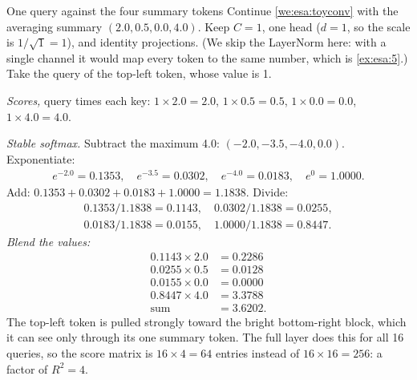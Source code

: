 \begin{worked}[label={we:esa:toyattn}]{One query against the four summary tokens}
Continue \cref{we:esa:toyconv} with the averaging summary $(2.0, 0.5, 0.0, 4.0)$. Keep $C = 1$,
one head ($d = 1$, so the scale is $1/\sqrt1 = 1$), and identity projections. (We skip the
LayerNorm here: with a single channel it would map every token to the same number, which is
\cref{ex:esa:5}.) Take the query of the top-left token, whose value is 1.

\emph{Scores,} query times each key: $1\times2.0 = 2.0$, $1\times0.5 = 0.5$, $1\times0.0 = 0.0$,
$1\times4.0 = 4.0$.

\emph{Stable softmax.} Subtract the maximum 4.0: $(-2.0, -3.5, -4.0, 0.0)$. Exponentiate:
\begin{align*}
  e^{-2.0} = 0.1353,\quad e^{-3.5} = 0.0302,\quad e^{-4.0} = 0.0183,\quad e^{0} = 1.0000 .
\end{align*}
Add: $0.1353 + 0.0302 + 0.0183 + 1.0000 = 1.1838$. Divide:
\begin{align*}
  0.1353/1.1838 = 0.1143,\quad 0.0302/1.1838 = 0.0255,\\
  0.0183/1.1838 = 0.0155,\quad 1.0000/1.1838 = 0.8447 .
\end{align*}
\emph{Blend the values:}
\begin{align*}
  0.1143\times2.0 &= 0.2286\\
  0.0255\times0.5 &= 0.0128\\
  0.0155\times0.0 &= 0.0000\\
  0.8447\times4.0 &= 3.3788\\
  \text{sum} &= 3.6202 .
\end{align*}
The top-left token is pulled strongly toward the bright bottom-right block, which it can see only
through its one summary token. The full layer does this for all 16 queries, so the score matrix is
$16\times4 = 64$ entries instead of $16\times16 = 256$: a factor of $R^2 = 4$.
\end{worked}


